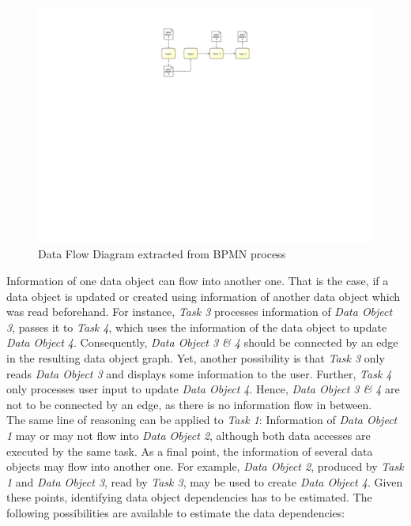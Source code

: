 \begin{figure}[h!]
	\centering
	\includegraphics[width=12cm, trim={10cm 14.5cm 10cm 2cm}]{img/DataFlowExample.pdf}
	\caption{Data Flow Diagram extracted from BPMN process}
	\label{fig:dataFlowExample}
\end{figure}

Information of one data object can flow into another one. That is the case, if a data object is updated or created using information of another data object which was read beforehand. 
For instance, \textit{Task 3} processes information of \textit{Data Object 3}, passes it to \textit{Task 4}, which uses the information of the data object to update \textit{Data Object 4}. Consequently, \textit{Data Object 3 \& 4} should be connected by an edge in the resulting data object graph. Yet, another possibility is that \textit{Task 3} only reads \textit{Data Object 3} and displays some information to the user. Further, \textit{Task 4} only processes user input to update \textit{Data Object 4}. Hence, \textit{Data Object 3 \& 4} are not to be connected by an edge, as there is no information flow in between. \\
The same line of reasoning can be applied to \textit{Task 1}: Information of \textit{Data Object 1} may or may not flow into \textit{Data Object 2}, although both data accesses are executed by the same task. As a final point, the information of several data objects may flow into another one. For example, \textit{Data Object 2}, produced by \textit{Task 1} and \textit{Data Object 3}, read by \textit{Task 3}, may be used to create \textit{Data Object 4}. Given these points, identifying data object dependencies has to be estimated. The following possibilities are available to estimate the data dependencies:

